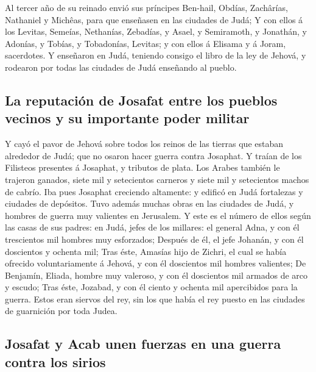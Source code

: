  Al tercer año de su reinado envió sus príncipes Ben-hail,
Obdías, Zachârías, Nathaniel y Michêas, para que enseñasen en las
ciudades de Judá;  Y con ellos á los Levitas, Semeías,
Nethanías, Zebadías, y Asael, y Semiramoth, y Jonathán, y Adonías, y
Tobías, y Tobadonías, Levitas; y con ellos á Elisama y á Joram,
sacerdotes.  Y enseñaron en Judá, teniendo consigo el libro
de la ley de Jehová, y rodearon por todas las ciudades de Judá enseñando
al pueblo.

\hypertarget{la-reputaciuxf3n-de-josafat-entre-los-pueblos-vecinos-y-su-importante-poder-militar}{%
\subsection{La reputación de Josafat entre los pueblos vecinos y su
importante poder
militar}\label{la-reputaciuxf3n-de-josafat-entre-los-pueblos-vecinos-y-su-importante-poder-militar}}

 Y cayó el pavor de Jehová sobre todos los reinos de las
tierras que estaban alrededor de Judá; que no osaron hacer guerra contra
Josaphat.  Y traían de los Filisteos presentes á Josaphat,
y tributos de plata. Los Arabes también le trajeron ganados, siete mil y
setecientos carneros y siete mil y setecientos machos de cabrío.
 Iba pues Josaphat creciendo altamente: y edificó en Judá
fortalezas y ciudades de depósitos.  Tuvo además muchas
obras en las ciudades de Judá, y hombres de guerra muy valientes en
Jerusalem.  Y este es el número de ellos según las casas de
sus padres: en Judá, jefes de los millares: el general Adna, y con él
trescientos mil hombres muy esforzados;  Después de él, el
jefe Johanán, y con él doscientos y ochenta mil;  Tras
éste, Amasías hijo de Zichri, el cual se había ofrecido voluntariamente
á Jehová, y con él doscientos mil hombres valientes;  De
Benjamín, Eliada, hombre muy valeroso, y con él doscientos mil armados
de arco y escudo;  Tras éste, Jozabad, y con él ciento y
ochenta mil apercibidos para la guerra.  Estos eran siervos
del rey, sin los que había el rey puesto en las ciudades de guarnición
por toda Judea.

\hypertarget{josafat-y-acab-unen-fuerzas-en-una-guerra-contra-los-sirios}{%
\subsection{Josafat y Acab unen fuerzas en una guerra contra los
sirios}\label{josafat-y-acab-unen-fuerzas-en-una-guerra-contra-los-sirios}}

